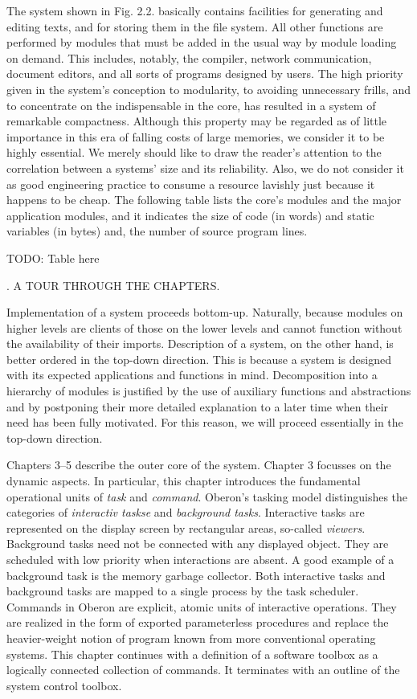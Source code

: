 The system shown in Fig. 2.2. basically contains facilities for
generating and editing texts, and for storing them in the file
system. All other functions are performed by modules that must be
added in the usual way by module loading on demand. This includes,
notably, the compiler, network communication, document editors, and
all sorts of programs designed by users. The high priority given in
the system's conception to modularity, to avoiding unnecessary frills,
and to concentrate on the indispensable in the core, has resulted in a
system of remarkable compactness. Although this property may be
regarded as of little importance in this era of falling costs of large
memories, we consider it to be highly essential. We merely should like
to draw the reader's attention to the correlation between a systems'
size and its reliability. Also, we do not consider it as good
engineering practice to consume a resource lavishly just because it
happens to be cheap. The following table lists the core's modules and
the major application modules, and it indicates the size of code (in
words) and static variables (in bytes) and, the number of source
program lines.

TODO: Table here

. A TOUR THROUGH THE CHAPTERS.

Implementation of a system proceeds bottom-up. Naturally, because
modules on higher levels are clients of those on the lower levels and
cannot function without the availability of their imports. Description
of a system, on the other hand, is better ordered in the top-down
direction. This is because a system is designed with its expected
applications and functions in mind. Decomposition into a hierarchy of
modules is justified by the use of auxiliary functions and
abstractions and by postponing their more detailed explanation to a
later time when their need has been fully motivated. For this reason,
we will proceed essentially in the top-down direction.

Chapters 3--5 describe the outer core of the system. Chapter 3
focusses on the dynamic aspects. In particular, this chapter
introduces the fundamental operational units of {\it task\/} and
{\it command\/}. Oberon's tasking model distinguishes the categories of
{\it interactiv taskse\/} and {\it background tasks\/}. Interactive tasks are
represented on the display screen by rectangular areas, so-called
{\it viewers\/}. Background tasks need not be connected with any displayed
object. They are scheduled with low priority when interactions are
absent. A good example of a background task is the memory garbage
collector. Both interactive tasks and background tasks are mapped to a
single process by the task scheduler. Commands in Oberon are explicit,
atomic units of interactive operations. They are realized in the form
of exported parameterless procedures and replace the heavier-weight
notion of program known from more conventional operating systems. This
chapter continues with a definition of a software toolbox as a
logically connected collection of commands. It terminates with an
outline of the system control toolbox.


